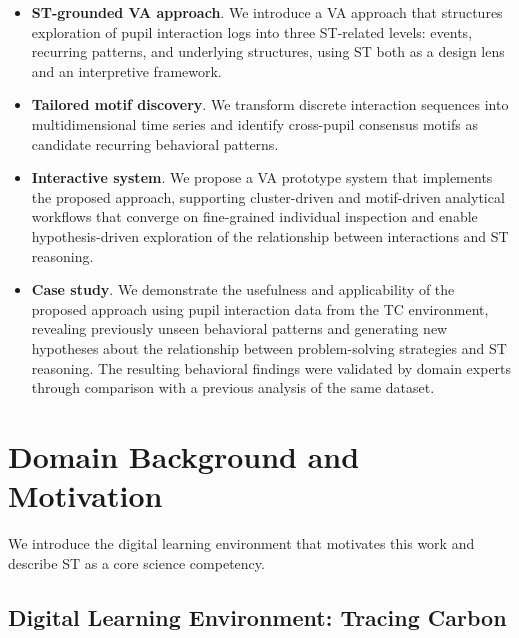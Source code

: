\documentclass[letterpaper,journal]{IEEEtran}
\begin{document}
\begin{itemize}[nosep]
    \item \textbf{ST-grounded VA approach}.
    We introduce a VA approach that structures exploration of pupil interaction logs into three ST-related levels: events, recurring patterns, and underlying structures, using ST both as a design lens and an interpretive framework.

    \item \textbf{Tailored motif discovery}.
    We transform discrete interaction sequences into multidimensional time series and identify cross-pupil consensus motifs as candidate recurring behavioral patterns.

    \item \textbf{Interactive system}.
    We propose a VA prototype system that implements the proposed approach, supporting cluster-driven and motif-driven analytical workflows that converge on fine-grained individual inspection and enable hypothesis-driven exploration of the relationship between interactions and ST reasoning.

    \item \textbf{Case study}.
    We demonstrate the usefulness and applicability of the proposed approach using pupil interaction data from the TC environment, revealing previously unseen behavioral patterns and generating new hypotheses about the relationship between problem-solving strategies and ST reasoning.
    The resulting behavioral findings were validated by domain experts through comparison with a previous analysis of the same dataset.
\end{itemize}





\section{Domain Background and Motivation}
\label{sec:domain}
We introduce the digital learning environment that motivates this work and describe ST as a core science competency.

\subsection{Digital Learning Environment: Tracing Carbon}
\end{document}
